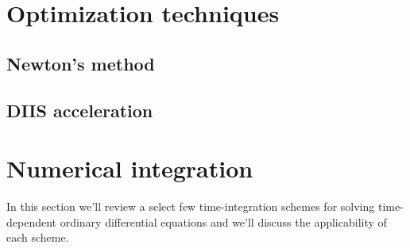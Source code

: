     \section{Optimization techniques}
        \subsection{Newton's method}
        \subsection{DIIS acceleration}
    \section{Numerical integration}
        \label{sec:numerical-integration}
        In this section we'll review a select few time-integration schemes for
        solving time-dependent ordinary differential equations and we'll discuss the
        applicability of each scheme.

